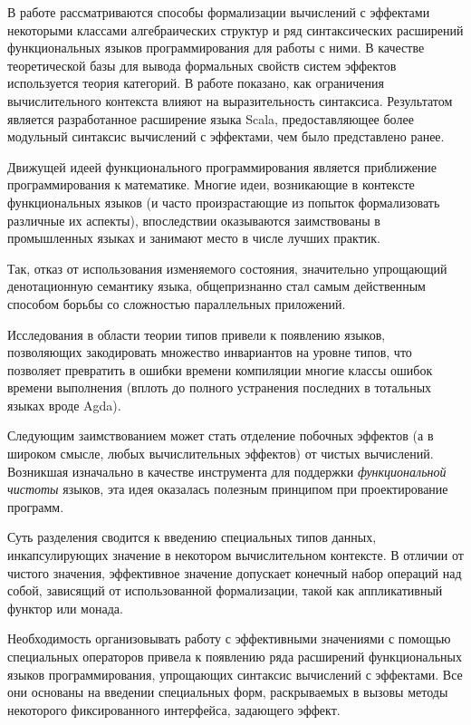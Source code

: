 





В работе рассматриваются способы формализации вычислений с эффектами некоторыми классами алгебраических структур и ряд синтаксических расширений функциональных языков программирования для работы с ними. В качестве теоретической базы для вывода формальных свойств систем эффектов используется теория категорий. В работе показано, как ограничения вычислительного контекста влияют на выразительность синтаксиса. Результатом является разработанное расширение языка Scala, пре\-доставляющее более модульный синтаксис вычислений с эффектами, чем было представлено ранее.

Движущей идеей функционального программирования является приближение программирования к математике\cite{Turner2004}. Многие идеи, возникающие в контексте функциональных языков (и часто произрастающие из попыток формализовать различные их аспекты), впоследствии оказываются заимствованы в промышленных языках и занимают место в числе лучших практик.

Так, отказ от использования изменяемого состояния, значительно уп\-рощающий денотационную семантику языка, общепризнанно стал самым действенным способом борьбы со сложностью параллельных приложений.

Исследования в области теории типов привели к появлению языков, позволяющих закодировать множество инвариантов на уровне типов, что позволяет превратить в ошибки времени компиляции многие классы ошибок времени выполнения (вплоть до полного устранения последних в тотальных языках вроде Agda\cite{norell2009dependently}).

Следующим заимствованием может стать отделение побочных эффектов (а в широком смысле, любых вычислительных эффектов) от чистых вычислений. Возникшая изначально в качестве инструмента для поддержки \emph{функциональной чистоты}\cite{Sabry1998} языков, эта идея оказалась полезным принципом при проектирование программ.

Суть разделения сводится к введению специальных типов данных, инкапсулирующих значение в некотором вычислительном контексте. В отличии от чистого значения, эффективное значение допускает конечный набор операций над собой, зависящий от использованной формализации, такой как аппликативный функтор или монада.

Необходимость организовывать работу с эффективными значениями с помощью специальных операторов привела к появлению ряда расширений функциональных языков программирования, упрощающих синтаксис вычислений с эффектами. Все они основаны на введении специальных форм, раскрываемых в вызовы методы некоторого фиксированного интерфейса, задающего эффект.

